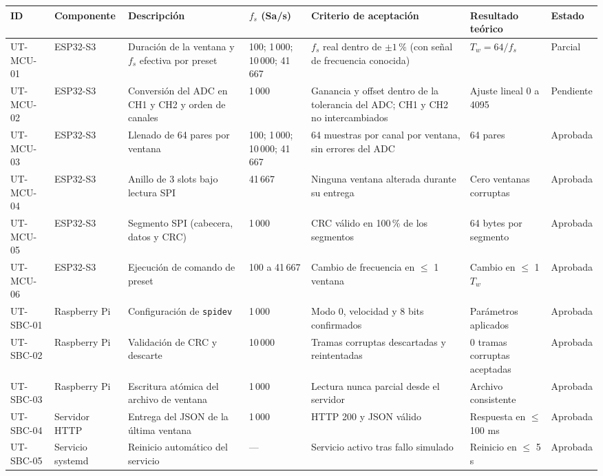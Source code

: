 \documentclass[12pt,a4paper]{article}
\begin{document}
\begin{table}[H]
\centering
\scriptsize
\begin{tabular}{@{}p{1.3cm} p{1.7cm} p{3.3cm} p{1.7cm} p{3.0cm} p{2.5cm} p{1.4cm}@{}}
\toprule
\textbf{ID} & \textbf{Componente} & \textbf{Descripción} & \textbf{$f_s$ (Sa/s)} & \textbf{Criterio de aceptación} & \textbf{Resultado teórico} & \textbf{Estado} \\
\midrule
UT-MCU-01 & ESP32-S3 & Duración de la ventana y $f_s$ efectiva por preset & 100; 1\,000; 10\,000; 41\,667 & $f_s$ real dentro de $\pm 1\,\%$ (con señal de frecuencia conocida) & $T_w = 64/f_s$ & Parcial \\
UT-MCU-02 & ESP32-S3 & Conversión del ADC en CH1 y CH2 y orden de canales & 1\,000 & Ganancia y offset dentro de la tolerancia del ADC; CH1 y CH2 no intercambiados & Ajuste lineal 0 a 4095 & Pendiente \\
UT-MCU-03 & ESP32-S3 & Llenado de 64 pares por ventana & 100; 1\,000; 10\,000; 41\,667 & 64 muestras por canal por ventana, sin errores del ADC & 64 pares & Aprobada \\
UT-MCU-04 & ESP32-S3 & Anillo de 3 slots bajo lectura SPI & 41\,667 & Ninguna ventana alterada durante su entrega & Cero ventanas corruptas & Aprobada \\
UT-MCU-05 & ESP32-S3 & Segmento SPI (cabecera, datos y CRC) & 1\,000 & CRC válido en 100\,\% de los segmentos & 64 bytes por segmento & Aprobada \\
UT-MCU-06 & ESP32-S3 & Ejecución de comando de preset & 100 a 41\,667 & Cambio de frecuencia en $\leq$ 1 ventana & Cambio en $\leq$ 1 $T_w$ & Aprobada \\
UT-SBC-01 & Raspberry Pi & Configuración de \texttt{spidev} & 1\,000 & Modo 0, velocidad y 8 bits confirmados & Parámetros aplicados & Aprobada \\
UT-SBC-02 & Raspberry Pi & Validación de CRC y descarte & 10\,000 & Tramas corruptas descartadas y reintentadas & 0 tramas corruptas aceptadas & Aprobada \\
UT-SBC-03 & Raspberry Pi & Escritura atómica del archivo de ventana & 1\,000 & Lectura nunca parcial desde el servidor & Archivo consistente & Aprobada \\
UT-SBC-04 & Servidor HTTP & Entrega del JSON de la última ventana & 1\,000 & HTTP 200 y JSON válido & Respuesta en $\leq$ 100 ms & Aprobada \\
UT-SBC-05 & Servicio systemd & Reinicio automático del servicio & --- & Servicio activo tras fallo simulado & Reinicio en $\leq$ 5 s & Aprobada \\

\end{tabular}
\end{table}
\end{document}
